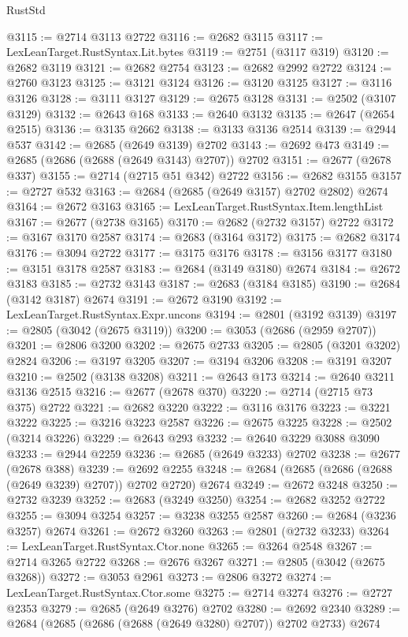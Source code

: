 \begin{lexlean}{RustStd}
\begin{coremodule}
@3115 := @2714 @3113 @2722
@3116 := @2682 @3115
@3117 := LexLeanTarget.RustSyntax.Lit.bytes
@3119 := @2751 (@3117 @319)
@3120 := @2682 @3119
@3121 := @2682 @2754
@3123 := @2682 @2992 @2722
@3124 := @2760 @3123
@3125 := @3121 @3124
@3126 := @3120 @3125
@3127 := @3116 @3126
@3128 := @3111 @3127
@3129 := @2675 @3128
@3131 := @2502 (@3107 @3129)
@3132 := @2643 @168
@3133 := @2640 @3132
@3135 := @2647 (@2654 @2515)
@3136 := @3135 @2662
@3138 := @3133 @3136 @2514
@3139 := @2944 @537
@3142 := @2685 (@2649 @3139) @2702
@3143 := @2692 @473
@3149 := @2685 (@2686 (@2688 (@2649 @3143) @2707)) @2702
@3151 := @2677 (@2678 @337)
@3155 := @2714 (@2715 @51 @342) @2722
@3156 := @2682 @3155
@3157 := @2727 @532
@3163 := @2684 (@2685 (@2649 @3157) @2702 @2802) @2674
@3164 := @2672 @3163
@3165 := LexLeanTarget.RustSyntax.Item.lengthList
@3167 := @2677 (@2738 @3165)
@3170 := @2682 (@2732 @3157) @2722
@3172 := @3167 @3170 @2587
@3174 := @2683 (@3164 @3172)
@3175 := @2682 @3174
@3176 := @3094 @2722
@3177 := @3175 @3176
@3178 := @3156 @3177
@3180 := @3151 @3178 @2587
@3183 := @2684 (@3149 @3180) @2674
@3184 := @2672 @3183
@3185 := @2732 @3143
@3187 := @2683 (@3184 @3185)
@3190 := @2684 (@3142 @3187) @2674
@3191 := @2672 @3190
@3192 := LexLeanTarget.RustSyntax.Expr.uncons
@3194 := @2801 (@3192 @3139)
@3197 := @2805 (@3042 (@2675 @3119))
@3200 := @3053 (@2686 (@2959 @2707))
@3201 := @2806 @3200
@3202 := @2675 @2733
@3205 := @2805 (@3201 @3202) @2824
@3206 := @3197 @3205
@3207 := @3194 @3206
@3208 := @3191 @3207
@3210 := @2502 (@3138 @3208)
@3211 := @2643 @173
@3214 := @2640 @3211 @3136 @2515
@3216 := @2677 (@2678 @370)
@3220 := @2714 (@2715 @73 @375) @2722
@3221 := @2682 @3220
@3222 := @3116 @3176
@3223 := @3221 @3222
@3225 := @3216 @3223 @2587
@3226 := @2675 @3225
@3228 := @2502 (@3214 @3226)
@3229 := @2643 @293
@3232 := @2640 @3229 @3088 @3090
@3233 := @2944 @2259
@3236 := @2685 (@2649 @3233) @2702
@3238 := @2677 (@2678 @388)
@3239 := @2692 @2255
@3248 := @2684 (@2685 (@2686 (@2688 (@2649 @3239) @2707)) @2702 @2720) @2674
@3249 := @2672 @3248
@3250 := @2732 @3239
@3252 := @2683 (@3249 @3250)
@3254 := @2682 @3252 @2722
@3255 := @3094 @3254
@3257 := @3238 @3255 @2587
@3260 := @2684 (@3236 @3257) @2674
@3261 := @2672 @3260
@3263 := @2801 (@2732 @3233)
@3264 := LexLeanTarget.RustSyntax.Ctor.none
@3265 := @3264 @2548
@3267 := @2714 @3265 @2722
@3268 := @2676 @3267
@3271 := @2805 (@3042 (@2675 @3268))
@3272 := @3053 @2961
@3273 := @2806 @3272
@3274 := LexLeanTarget.RustSyntax.Ctor.some
@3275 := @2714 @3274
@3276 := @2727 @2353
@3279 := @2685 (@2649 @3276) @2702
@3280 := @2692 @2340
@3289 := @2684 (@2685 (@2686 (@2688 (@2649 @3280) @2707)) @2702 @2733) @2674

\end{coremodule}
\end{lexlean}
